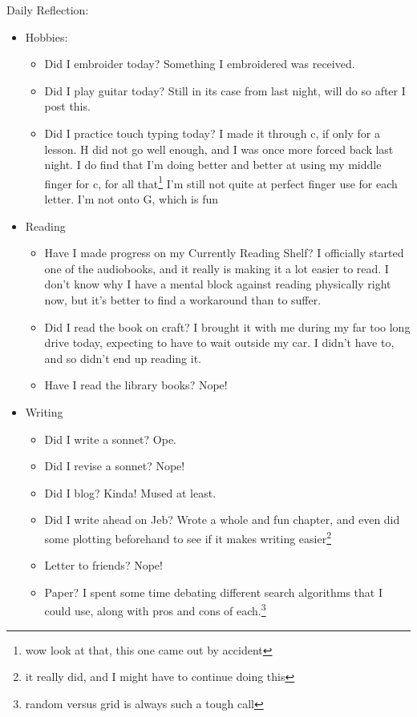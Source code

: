 \documentclass[12pt]{article}[titlepage]
\newcommand{\1}{\={a}}
\newcommand{\2}{\={e}}
\newcommand{\3}{\={\i}}
\newcommand{\4}{\=o}
\newcommand{\5}{\=u}
\newcommand{\6}{\={A}}
\renewcommand{\,}{\textsuperscript{,}}
\begin{document}
Daily Reflection:
\begin{itemize}
\item Hobbies:
\begin{itemize}
\item Did I embroider today? Something I embroidered was received.
\item Did I play guitar today? Still in its case from last night, will do so after I post this.
\item Did I practice touch typing today? I made it through c, if only for a lesson. H did not go well enough, and I was once more forced back last night. I do find that I'm doing better and better at using my middle finger for c, for all that\footnote{wow look at that, this one came out by accident} I'm still not quite at perfect finger use for each letter. I'm not onto G, which is fun
\end{itemize}
\item Reading
\begin{itemize}
\item Have I made progress on my Currently Reading Shelf? I officially started one of the audiobooks, and it really is making it a lot easier to read. I don't know why I have a mental block against reading physically right now, but it's better to find a workaround than to suffer.
\item Did I read the book on craft? I brought it with me during my far too long drive today, expecting to have to wait outside my car.
I didn't have to, and so didn't end up reading it.
\item Have I read the library books? Nope!
\end{itemize}
\item Writing
\begin{itemize}
\item Did I write a sonnet? Ope.
\item Did I revise a sonnet? Nope!
\item Did I blog? Kinda! Mused at least.
\item Did I write ahead on Jeb? Wrote a whole and fun chapter, and even did some plotting beforehand to see if it makes writing easier\footnote{it really did, and I might have to continue doing this}
\item Letter to friends? Nope!
\item Paper? I spent some time debating different search algorithms that I could use, along with pros and cons of each.\footnote{random versus grid is always such a tough call}
\end{itemize}
\end{itemize}
\end{document}
